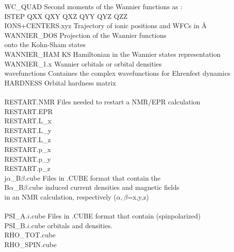 \documentclass[twoside,10pt,titlepage,a4paper]{article}
\begin{document}
\begin{tabbing}
WC\_QUAD        \> Second moments of the Wannier functions as : \\
                \> ISTEP QXX QXY QXZ QYY QYZ QZZ              \\
IONS+CENTERS.xyz\> Trajectory of ionic positions and WFCs in \AA\\
WANNIER\_DOS    \> Projection of the Wannier functions   \\
                \> onto the Kohn-Sham states             \\
WANNIER\_HAM    \> KS Hamiltonian in the Wannier states representation \\
WANNIER\_1.x    \> Wannier orbitals or orbital densities \\
wavefunctions   \> Containes the complex wavefunctions for Ehrenfest dynamics\\
HARDNESS        \> Orbital hardness matrix               \\
\\
RESTART.NMR     \> Files needed to restart a NMR/EPR calculation \\
RESTART.EPR      \\
RESTART.L\_x     \\
RESTART.L\_y     \\
RESTART.L\_z     \\
RESTART.p\_x     \\
RESTART.p\_y     \\
RESTART.p\_z     \\
j$\alpha$\_B$\beta$.cube \> Files in .CUBE format that contain the \\
B$\alpha$\_B$\beta$.cube \> induced current densities and magnetic fields \\
                 \> in an NMR calculation, respectively
                    ($\alpha,\beta$=x,y,z)\\
\\
PSI\_A.$i$.cube  \> Files in .CUBE format that contain (spinpolarized) \\
PSI\_B.$i$.cube  \> orbitals and densities.\\
RHO\_TOT.cube    \\
RHO\_SPIN.cube   \\
\\


\end{tabbing}
\end{document}
